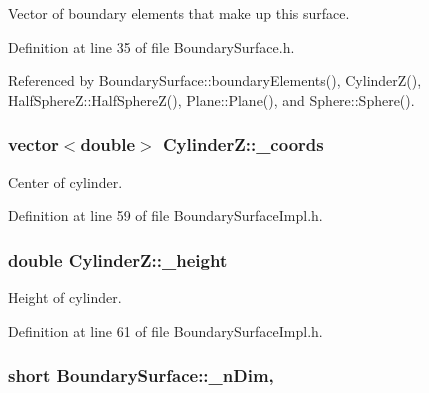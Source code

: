 Vector of boundary elements that make up this surface. 



Definition at line 35 of file Boundary\+Surface.\+h.



Referenced by Boundary\+Surface\+::boundary\+Elements(), Cylinder\+Z(), Half\+Sphere\+Z\+::\+Half\+Sphere\+Z(), Plane\+::\+Plane(), and Sphere\+::\+Sphere().

\hypertarget{classCylinderZ_abd9018022be64ad2ab69822cc8ea4d03}{
\subsubsection[{\+\_\+coords}]{\setlength{\rightskip}{0pt plus 5cm}vector$<$double$>$ Cylinder\+Z\+::\+\_\+coords\hspace{0.3cm}{\ttfamily [private]}}}\label{classCylinderZ_abd9018022be64ad2ab69822cc8ea4d03}


Center of cylinder. 



Definition at line 59 of file Boundary\+Surface\+Impl.\+h.

\hypertarget{classCylinderZ_a8da56d3fed09871e6fd188fa6ed515c2}{
\subsubsection[{\+\_\+height}]{\setlength{\rightskip}{0pt plus 5cm}double Cylinder\+Z\+::\+\_\+height\hspace{0.3cm}{\ttfamily [private]}}}\label{classCylinderZ_a8da56d3fed09871e6fd188fa6ed515c2}


Height of cylinder. 



Definition at line 61 of file Boundary\+Surface\+Impl.\+h.

\hypertarget{classBoundarySurface_af3ed79310c6ba6cdc8e9f176bf463eb1}{
\subsubsection[{\+\_\+n\+Dim}]{\setlength{\rightskip}{0pt plus 5cm}short Boundary\+Surface\+::\+\_\+n\+Dim\hspace{0.3cm}{\ttfamily [protected]}, {\ttfamily [inherited]}}}\label{classBoundarySurface_af3ed79310c6ba6cdc8e9f176bf463eb1}



